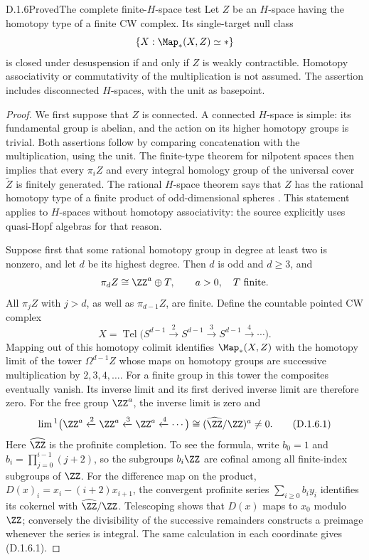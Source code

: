 \begin{claim}{D.1.6}{Proved}{The complete finite-$H$-space test}
Let $Z$ be an $H$-space having the homotopy type of a finite CW
complex. Its single-target null class
\[
 \{X:\Map_*(X,Z)\simeq *\}
\]
is closed under desuspension if and only if $Z$ is weakly
contractible. Homotopy associativity or commutativity of the
multiplication is not assumed. The assertion includes disconnected
$H$-spaces, with the unit as basepoint.
\end{claim}
\begin{proof}
We first suppose that $Z$ is connected. A connected $H$-space is
simple: its fundamental group is abelian, and the action on its
higher homotopy groups is trivial. Both assertions follow by
comparing concatenation with the multiplication, using the unit.
The finite-type theorem for nilpotent spaces
\cite[Theorem~4.5.2]{I_MayPonto2012} then implies that every
$\pi_i Z$ and every integral homology group of the universal cover
$\widetilde Z$ is finitely generated. The rational $H$-space
theorem says that $Z$ has the rational homotopy type of a finite
product of odd-dimensional spheres
\cite[Theorem~9.1.1 and Corollary~9.1.2]{I_MayPonto2012}.
This statement applies to $H$-spaces without homotopy associativity:
the source explicitly uses quasi-Hopf algebras for that reason.

Suppose first that some rational homotopy group in degree at least
two is nonzero, and let $d$ be its highest degree. Then $d$ is odd
and $d\geq3$, and
\[
 \pi_d Z\cong\ZZ^a\oplus T,\qquad a>0,\quad T\text{ finite}.
\]
All $\pi_jZ$ with $j>d$, as well as $\pi_{d-1}Z$, are finite.
Define the countable pointed CW complex
\[
 X=\operatorname{Tel}\bigl(
 S^{d-1}\xrightarrow{2}S^{d-1}
 \xrightarrow{3}S^{d-1}
 \xrightarrow{4}\cdots\bigr).
\]
Mapping out of this homotopy colimit identifies $\Map_*(X,Z)$
with the homotopy limit of the tower $\Omega^{d-1}Z$ whose maps
on homotopy groups are successive multiplication by $2,3,4,\ldots$.
For a finite group in this tower the composites eventually vanish.
Its inverse limit and its first derived inverse limit are therefore
zero. For the free group $\ZZ^a$, the inverse limit is zero and
\[
 \lim{}^1\bigl(\ZZ^a\xleftarrow{2}\ZZ^a
                 \xleftarrow{3}\ZZ^a
                 \xleftarrow{4}\cdots\bigr)
       \cong(\widehat{\ZZ}/\ZZ)^a\ne0.                 \tag{D.1.6.1}
\]
Here $\widehat{\ZZ}$ is the profinite completion. To see the
formula, write $b_0=1$ and
$b_i=\prod_{j=0}^{i-1}(j+2)$, so the subgroups $b_i\ZZ$ are
cofinal among all finite-index subgroups of $\ZZ$.
For the difference map on the product,
$D(x)_i=x_i-(i+2)x_{i+1}$, the convergent profinite series
$\sum_{i\geq0}b_i y_i$ identifies its cokernel with
$\widehat{\ZZ}/\ZZ$. Telescoping shows that $D(x)$ maps to $x_0$
modulo $\ZZ$; conversely the divisibility of the successive
remainders constructs a preimage whenever the series is integral.
The same calculation in each coordinate gives (D.1.6.1).


\end{proof}
